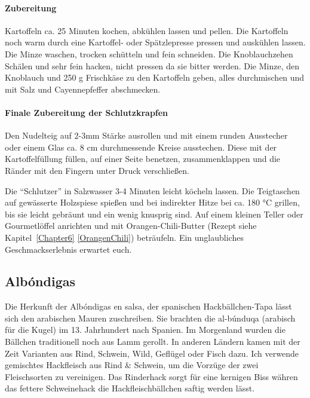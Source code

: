 \paragraph{Zubereitung}

Kartoffeln ca. 25 Minuten kochen, abkühlen lassen und pellen. Die Kartoffeln noch warm durch eine Kartoffel- oder Spätzlepresse 
pressen und auskühlen lassen. Die Minze waschen, trocken schütteln und fein schneiden. Die Knoblauchzehen Schälen und sehr fein 
hacken, nicht pressen da sie bitter werden. Die Minze, den Knoblauch und 250 g Frischkäse zu den Kartoffeln geben, alles durchmischen 
und mit Salz und Cayennepfeffer abschmecken.

\paragraph{Finale Zubereitung der Schlutzkrapfen}

Den Nudelteig auf 2-3mm Stärke ausrollen und mit einem runden Ausstecher oder einem Glas ca. 8 cm durchmessende Kreise 
ausstechen. Diese mit der Kartoffelfüllung füllen, auf einer Seite benetzen, zusammenklappen und die Ränder mit den Fingern unter 
Druck verschließen.

Die "`Schlutzer"' in Salzwasser 3-4 Minuten leicht köcheln lassen. Die Teigtaschen auf gewässerte Holzspiese spießen und bei 
indirekter Hitze bei ca. 180 °C grillen, bis sie leicht gebräunt und ein wenig knusprig sind. Auf einem kleinen Teller oder Gourmetlöffel 
anrichten und mit Orangen-Chili-Butter (Rezept siehe 
Kapitel~\ref{Chapter6} \vref{OrangenChili}) beträufeln. Ein unglaubliches Geschmackserlebnis erwartet euch.

\subsection{Albóndigas}

Die Herkunft der Albóndigas en salsa, der spanischen Hackbällchen-Tapa lässt sich den arabischen Mauren zuschreiben. Sie brachten 
die al-búnduqa (arabisch für die Kugel) im 13. Jahrhundert nach Spanien. Im Morgenland wurden die Bällchen traditionell noch aus Lamm 
gerollt. In anderen Ländern kamen mit der Zeit Varianten aus Rind, Schwein, Wild, Geflügel oder Fisch dazu. Ich verwende gemischtes 
Hackfleisch aus Rind \& Schwein, um die Vorzüge der zwei Fleischsorten zu vereinigen. Das Rinderhack sorgt für eine kernigen Biss 
währen das fettere Schweinehack die Hackfleischbällchen saftig werden lässt.

